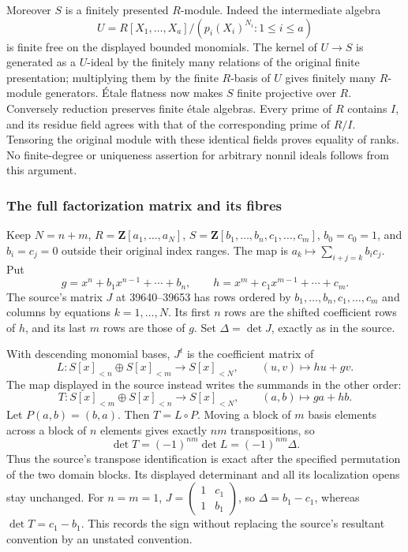 Moreover \(S\) is a finitely presented \(R\)-module. Indeed the intermediate algebra \[
U=R[X_1,\ldots,X_a]/(p_i(X_i)^{N_i}:1\le i\le a)
\] is finite free on the displayed bounded monomials. The kernel of \(U\to S\) is generated as a \(U\)-ideal by the finitely many relations of the original finite presentation; multiplying them by the finite \(R\)-basis of \(U\) gives finitely many \(R\)-module generators. Étale flatness now makes \(S\) finite projective over \(R\). Conversely reduction preserves finite étale algebras. Every prime of \(R\) contains \(I\), and its residue field agrees with that of the corresponding prime of \(R/I\). Tensoring the original module with these identical fields proves equality of ranks. No finite-degree or uniqueness assertion for arbitrary nonnil ideals follows from this argument.

\subsubsection{The full factorization matrix and its fibres}\label{the-full-factorization-matrix-and-its-fibres}

Keep \(N=n+m\), \(R=\mathbf Z[a_1,\ldots,a_N]\), \(S=\mathbf Z[b_1,\ldots,b_n,c_1,\ldots,c_m]\), \(b_0=c_0=1\), and \(b_i=c_j=0\) outside their original index ranges. The map is \(a_k\mapsto\sum_{i+j=k}b_ic_j\). Put \[
g=x^n+b_1x^{n-1}+\cdots+b_n,\qquad
h=x^m+c_1x^{m-1}+\cdots+c_m.
\] The source's matrix \(J\) at 39640--39653 has rows ordered by \(b_1,\ldots,b_n,c_1,\ldots,c_m\) and columns by equations \(k=1,\ldots,N\). Its first \(n\) rows are the shifted coefficient rows of \(h\), and its last \(m\) rows are those of \(g\). Set \(\Delta=\det J\), exactly as in the source.

With descending monomial bases, \(J^t\) is the coefficient matrix of \[
L:S[x]_{<n}\oplus S[x]_{<m}\longrightarrow S[x]_{<N},
\qquad (u,v)\longmapsto hu+gv.
\] The map displayed in the source instead writes the summands in the other order: \[
T:S[x]_{<m}\oplus S[x]_{<n}\longrightarrow S[x]_{<N},
\qquad(a,b)\longmapsto ga+hb.
\] Let \(P(a,b)=(b,a)\). Then \(T=L\circ P\). Moving a block of \(m\) basis elements across a block of \(n\) elements gives exactly \(nm\) transpositions, so \[
\det T=(-1)^{nm}\det L=(-1)^{nm}\Delta.
\] Thus the source's transpose identification is exact after the specified permutation of the two domain blocks. Its displayed determinant and all its localization opens stay unchanged. For \(n=m=1\), \(J=\left(\begin{smallmatrix}1&c_1\\1&b_1\end{smallmatrix}\right)\), so \(\Delta=b_1-c_1\), whereas \(\det T=c_1-b_1\). This records the sign without replacing the source's resultant convention by an unstated convention.

